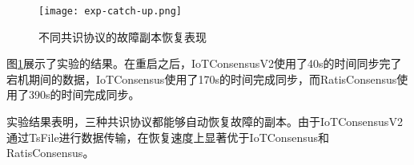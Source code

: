 \begin{figure}[!t]
    \centering
    \texttt{[image: exp-catch-up.png]}
    \caption{不同共识协议的故障副本恢复表现}
    \label{fig:exp-catch-up}
\end{figure}

图\ref{fig:exp-catch-up}展示了实验的结果。在重启之后，IoTConsensusV2使用了40s的时间同步完了宕机期间的数据，IoTConsensus使用了170s的时间完成同步，而RatisConsensus使用了390s的时间完成同步。

实验结果表明，三种共识协议都能够自动恢复故障的副本。由于IoTConsensusV2通过TsFile进行数据传输，在恢复速度上显著优于IoTConsensus和RatisConsensus。




